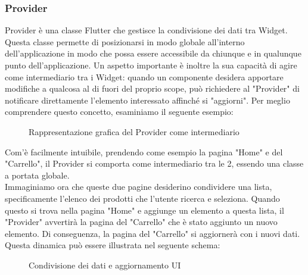 \subsubsection{Provider} \label{subsub:provider}
Provider \cite{provider} è una classe Flutter che gestisce la condivisione dei dati tra Widget. Questa classe permette di posizionarsi in modo globale all'interno dell'applicazione in modo che possa essere accessibile da chiunque e in qualunque punto dell'applicazione. Un aspetto importante è inoltre la sua capacità di agire come intermediario tra i Widget: quando un componente desidera apportare modifiche a qualcosa al di fuori del proprio scope, può richiedere al "Provider" di notificare direttamente l'elemento interessato affinché si "aggiorni". Per meglio comprendere questo concetto, esaminiamo il seguente esempio:
\begin{figure}[H]
	\centering
	\caption{Rappresentazione grafica del Provider come intermediario}
	\label{fig:provider_example1}
\end{figure}
\noindent
Com'è facilmente intuibile, prendendo come esempio la pagina "Home" e del "Carrello", il Provider si comporta come intermediario tra le 2, essendo una classe a portata globale.\\
Immaginiamo ora che queste due pagine desiderino condividere una lista, specificamente l'elenco dei prodotti che l'utente ricerca e seleziona. Quando questo si trova nella pagina "Home" e aggiunge un elemento a questa lista, il "Provider" avvertirà la pagina del "Carrello" che è stato aggiunto un nuovo elemento. Di conseguenza, la pagina del "Carrello" si aggiornerà con i nuovi dati. Questa dinamica può essere illustrata nel seguente schema:
\begin{figure}[H]
	\centering
	\caption{Condivisione dei dati e aggiornamento UI}
	\label{fig:provider_example2}
\end{figure}

